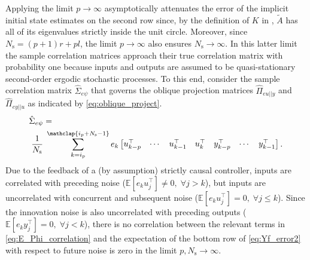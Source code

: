 Applying the limit $p\rightarrow\infty$ asymptotically attenuates the error of the implicit initial state estimates on the second row since, by the definition of $K$ in , $\tilde{A}$ has all of its eigenvalues strictly inside the unit circle. Moreover, since $N_\mathrm{s}=(p+1)r+pl$, the limit $p\rightarrow\infty$ also ensures $N_\mathrm{s}\rightarrow\infty$. In this latter limit the sample correlation matrices approach their true correlation matrix with probability one because inputs and outputs are assumed to be quasi-stationary second-order ergodic stochastic processes. To this end, consider the sample correlation matrix $\hat{\Sigma}_{e\psi}$ that governs the oblique projection matrices $\hat{\Pi}_{eu||y}$ and $\hat{\Pi}_{ey||u}$ as indicated by \eqref{eq:oblique_project}.
\begin{align}%
    \begin{split}
        &\hat{\Sigma}_{e\psi} = \\
        &\;\frac{1}{N_\mathrm{s}}\;\sum\limits_{k=i_p}^{\mathclap{i_p+N_\mathrm{s}-1}} e_k \begin{bmatrix}u_{k-p}^\top & \cdots & u_{k-1}^\top & u_k^\top & y_{k-p}^\top & \cdots & y_{k-1}^\top \end{bmatrix}.
    \end{split}
\end{align}
Due to the feedback of a (by assumption) strictly causal controller, inputs are correlated with preceding noise (${\mathbb{E}[e_k u_j^\top]\neq0,\; \forall j>k}$), but inputs are uncorrelated with concurrent and subsequent noise (${\mathbb{E}[e_k u_j^\top]=0,\; \forall j\leq k}$). Since the innovation noise is also uncorrelated with preceding outputs (${\mathbb{E}[e_k y_j^\top]=0,\; \forall j<k}$), there is no correlation between the relevant terms in \eqref{eq:E_Phi_correlation} and the expectation of the bottom row of \eqref{eq:Yf_error2} with respect to future noise is zero in the limit $p,N_\mathrm{s}\rightarrow\infty$.


